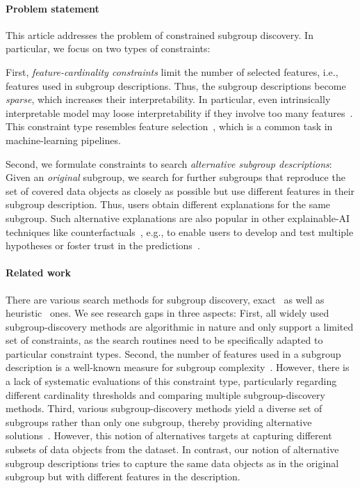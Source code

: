 \documentclass{article}
\theoremstyle{definition}
\begin{document}
\paragraph{Problem statement}

This article addresses the problem of constrained subgroup discovery.
In particular, we focus on two types of constraints:

First, \emph{feature-cardinality constraints} limit the number of selected features, i.e., features used in subgroup descriptions.
Thus, the subgroup descriptions become \emph{sparse}, which increases their interpretability.
In particular, even intrinsically interpretable model may loose interpretability if they involve too many features~\cite{molnar2020interpretable}.
This constraint type resembles feature selection~\cite{guyon2003introduction, li2017feature}, which is a common task in machine-learning pipelines.

Second, we formulate constraints to search \emph{alternative subgroup descriptions}:
Given an \emph{original} subgroup, we search for further subgroups that reproduce the set of covered data objects as closely as possible but use different features in their subgroup description.
Thus, users obtain different explanations for the same subgroup.
Such alternative explanations are also popular in other explainable-AI techniques like counterfactuals~\cite{mothilal2020explaining, russell2019efficient}, e.g., to enable users to develop and test multiple hypotheses or foster trust in the predictions~\cite{kim2021multi, wang2019designing}.

\paragraph{Related work}

There are various search methods for subgroup discovery, exact~\cite{atzmueller2006sd, bosc2018anytime, grosskreutz2009subgroup, lemmerich2010fast} as well as heuristic~\cite{friedman1999bump, leeuwen2012diverse, mampaey2012efficient, proencca2022robust} ones.
We see research gaps in three aspects:
First, all widely used subgroup-discovery methods are algorithmic in nature and only support a limited set of constraints, as the search routines need to be specifically adapted to particular constraint types.
Second, the number of features used in a subgroup description is a well-known measure for subgroup complexity~\cite{helal2016subgroup, herrera2011overview, ventura2018subgroup}.
However, there is a lack of systematic evaluations of this constraint type, particularly regarding different cardinality thresholds and comparing multiple subgroup-discovery methods.
Third, various subgroup-discovery methods yield a diverse set of subgroups rather than only one subgroup, thereby providing alternative solutions~\cite{belfodil2019fssd, bosc2018anytime, leeuwen2012diverse, lemmerich2010fast, lucas2018ssdp+, proencca2022robust}.
However, this notion of alternatives targets at capturing different subsets of data objects from the dataset.
In contrast, our notion of alternative subgroup descriptions tries to capture the same data objects as in the original subgroup but with different features in the description.
\end{document}
